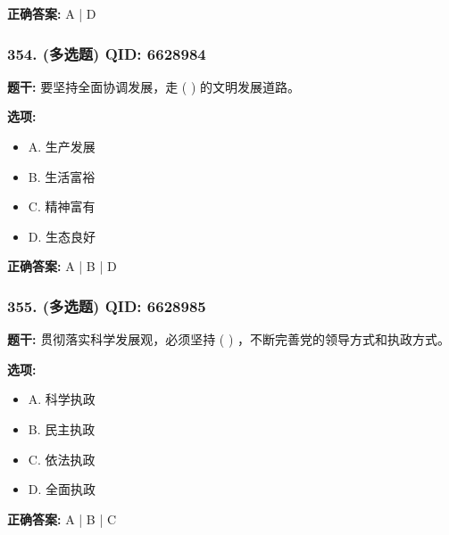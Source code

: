 \documentclass[12pt,UTF8]{ctexart}
\begin{document}
\textbf{正确答案:}
A | D

\vspace{0.3em}\hrulefill\vspace{0.7em}

\subsubsection*{354. (多选题) \small QID: 6628984}

\textbf{题干:}
要坚持全面协调发展，走  ( )  的文明发展道路。

\textbf{选项:}
\begin{itemize}[leftmargin=*]

  \item A. 生产发展

  \item B. 生活富裕

  \item C. 精神富有

  \item D. 生态良好

\end{itemize}

\textbf{正确答案:}
A | B | D

\vspace{0.3em}\hrulefill\vspace{0.7em}

\subsubsection*{355. (多选题) \small QID: 6628985}

\textbf{题干:}
贯彻落实科学发展观，必须坚持  ( )  ，不断完善党的领导方式和执政方式。

\textbf{选项:}
\begin{itemize}[leftmargin=*]

  \item A. 科学执政

  \item B. 民主执政

  \item C. 依法执政

  \item D. 全面执政

\end{itemize}

\textbf{正确答案:}
A | B | C

\vspace{0.3em}\hrulefill\vspace{0.7em}
\end{document}
